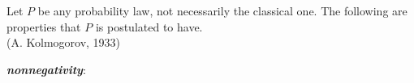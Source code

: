 \documentclass[12pt]{article}
\begin{document}
%
%
%
%
%


\newpage



\noindent Let $P$ be any probability law, not necessarily the classical one.  The following are properties that $P$ is postulated to have.\\

\label{axioms1} (A. Kolmogorov, 1933)\smallskip

 {\bf \em nonnegativity}:
\end{document}
